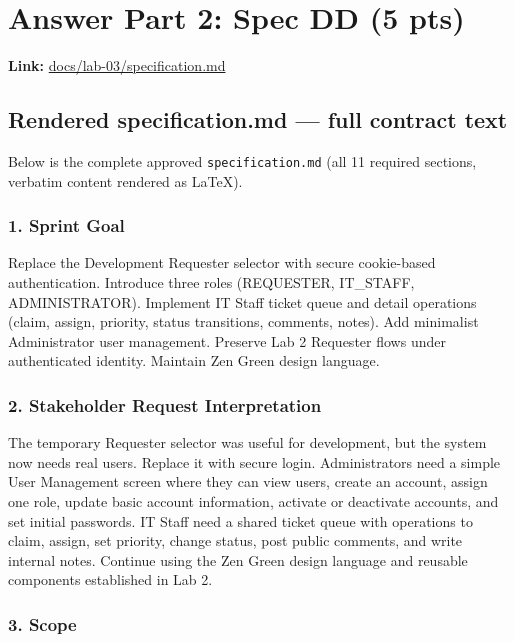 \documentclass[11pt,a4paper]{article}
\begin{document}
\section*{Answer Part 2: Spec DD (5 pts)}

\textbf{Link:} \href{https://github.com/thhanabun/Software\_Eng\_Lab/blob/main/docs/lab-03/specification.md}{docs/lab-03/specification.md}

\subsection*{Rendered specification.md --- full contract text}
Below is the complete approved \texttt{specification.md} (all 11 required sections, verbatim content rendered as LaTeX).

\subsubsection*{1. Sprint Goal}
Replace the Development Requester selector with secure cookie-based authentication. Introduce three roles (REQUESTER, IT\_STAFF, ADMINISTRATOR). Implement IT Staff ticket queue and detail operations (claim, assign, priority, status transitions, comments, notes). Add minimalist Administrator user management. Preserve Lab 2 Requester flows under authenticated identity. Maintain Zen Green design language.

\subsubsection*{2. Stakeholder Request Interpretation}
The temporary Requester selector was useful for development, but the system now needs real users. Replace it with secure login. Administrators need a simple User Management screen where they can view users, create an account, assign one role, update basic account information, activate or deactivate accounts, and set initial passwords. IT Staff need a shared ticket queue with operations to claim, assign, set priority, change status, post public comments, and write internal notes. Continue using the Zen Green design language and reusable components established in Lab 2.

\subsubsection*{3. Scope}
\end{document}
